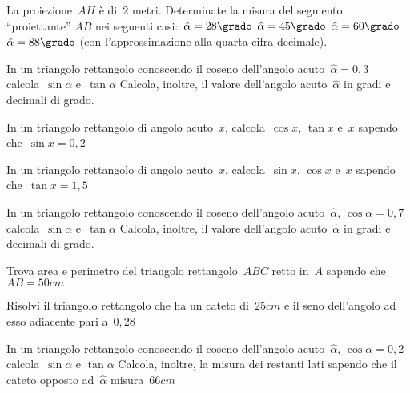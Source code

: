 \begin{multicols}{2}
\begin{esercizio}
\label{ese:G.14}
La proiezione~$AH$ è di~$2$ metri. Determinate la misura 
del segmento ``proiettante'' $AB$ nei seguenti casi:~${\hat{\alpha}}=28\grado$
${\hat{\alpha}}=45\grado$ ${\hat{\alpha}}=60\grado$ ${\hat{\alpha}}=88\grado$ 
(con l'approssimazione alla quarta cifra decimale).
\begin{center}
 
\end{center}
\end{esercizio}

\begin{esercizio}
\label{ese:G.15}
In un triangolo rettangolo conoscendo il coseno dell'angolo 
acuto~$\hat{\alpha}=0,3$ calcola~$\sin \alpha$ e~$\tan \alpha$
Calcola, inoltre, il valore dell'angolo acuto~$\hat{\alpha}$ in gradi e decimali 
di grado.
\end{esercizio}

\begin{esercizio}
\label{ese:G.16}
In un triangolo rettangolo di angolo acuto~$x$, calcola~$\cos x$, $\tan x$ 
e~$x$ sapendo che~$\sin x=0,2$
\end{esercizio}

\begin{esercizio}
\label{ese:G.17}
In un triangolo rettangolo di angolo acuto~$x$, calcola~$\sin x$, $\cos x$ 
e~$x$ sapendo che~$\tan x =1,5$
\end{esercizio}

\begin{esercizio}
\label{ese:G.18}
In un triangolo rettangolo conoscendo il coseno dell'angolo 
acuto~$\hat{\alpha}$, $\cos \alpha = 0,7$ calcola~$\sin \alpha$ e~$\tan \alpha$
Calcola, inoltre, il valore dell'angolo acuto~$\hat{\alpha}$ in gradi e decimali 
di grado.
\end{esercizio}

\begin{esercizio}
\label{ese:G.19}
Trova area e perimetro del triangolo rettangolo~$ABC$ retto in~$A$ sapendo 
che~$AB=50\unit{cm}$
\end{esercizio}

\begin{esercizio}
\label{ese:G.20}
Risolvi il triangolo rettangolo che ha un cateto di~$25\unit{cm}$ e il seno 
dell'angolo ad esso adiacente pari a~$0,28$
\end{esercizio}

\begin{esercizio}
\label{ese:G.21}
In un triangolo rettangolo conoscendo il coseno dell'angolo 
acuto~$\hat{\alpha}$, $\cos \alpha = 0,2$ calcola~$\sin \alpha$ e
$\tan \alpha$ Calcola, inoltre, la misura dei restanti lati sapendo che il 
cateto opposto ad~$\hat{\alpha}$ misura~$66\unit{cm}$
\end{esercizio}
\end{multicols}

